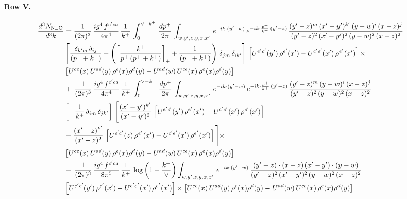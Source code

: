 \documentclass[10pt]{article}
\numberwithin{equation}{section}
\begin{document}
\paragraph{Row V.}
\begin{align}
    \frac{d^{3}N_{\rm NLO}}{d^{3}k} & =  \frac{1}{(2\pi)^{3}}\, \frac{ig^{4}\,f^{c'ca}}{4\pi^{4}}\, \frac{1}{k^{+}}\,\int_{0}^{\vee-k^{+}}\, \frac{dp^{+}}{2\pi}\, \int_{w,y',z,y,x,x'}\, e^{-ik\cdot (y'-w)}\, e^{-ik\cdot \frac{p^{+}}{k^{+}}\,(y'-z)}\,\frac{(y'-z)^{m}\,(x'-y')^{k'}\,(y-w)^{i}\,(x-z)^{j}}{(y'-z)^{2}\,(x'-y')^{2}\,(y-w)^{2}\,(x-z)^{2}}\notag \\ & \left[\frac{\delta_{k'm}\,\delta_{ij}}{(p^{+}+k^{+})}-\left(\left[\frac{k^{+}}{p^{+}\,(p^{+}+k^{+})}\right]_{+}+\frac{1}{(p^{+}+k^{+})}\right)\,\delta_{jm}\,\delta_{ik'}\right]\, \left[U^{e'c'}(y')\,\rho^{e'}(x')-U^{c'e'}(x')\,\rho^{e'}(x')\right]\times \notag \\ &  \left[U^{ce}(x)\,U^{ad}(y)\,\rho^{e}(x)\rho^{d}(y)-U^{ad}(w)\,U^{ce}(x)\,\rho^{e}(x)\rho^{d}(y)\right] \notag \\
&   +\,\frac{1}{(2\pi)^{3}}\, \frac{ig^{4}\,f^{c'ca}}{4\pi^{4}}\, \frac{1}{k^{+}}\,\int_{0}^{\vee-k^{+}}\, \frac{dp^{+}}{2\pi}\, \int_{w,y',z,y,x,x'}\, e^{-ik\cdot (y'-w)}\, e^{-ik\cdot \frac{p^{+}}{k^{+}}\,(y'-z)}\,\frac{(y'-z)^{m}\,(y-w)^{i}\,(x-z)^{j}}{(y'-z)^{2}\,(y-w)^{2}\,(x-z)^{2}}\notag \\ &   \left[-\frac{1}{k^{+}}\, \delta_{im}\, \delta_{jk'}\right]\, \Bigg[\frac{(x'-y')^{k'}}{(x'-y')^{2}}\,\left[U^{e'c'}(y')\,\rho^{e'}(x')-U^{c'e'}(x')\,\rho^{e'}(x')\right]\notag \\ & -\frac{(x'-z)^{k'}}{(x'-z)^{2}}\,\left[U^{e'c'}(z)\,\rho^{e'}(x')-U^{c'e'}(x')\,\rho^{e'}(x')\right]\Bigg]\times \notag \\ &    \left[U^{ce}(x)\,U^{ad}(y)\,\rho^{e}(x)\rho^{d}(y)-U^{ad}(w)\,U^{ce}(x)\,\rho^{e}(x)\rho^{d}(y)\right] \notag \\
& -\,\frac{1}{(2\pi)^{3}}\, \frac{ig^{4}\,f^{c'ca}}{8\pi^{5}}\, \frac{1}{k^{+}}\,\log{\left(1-\frac{k^{+}}{\vee}\right)} \int_{w,y',z,y,x,x'}\, e^{-ik\cdot (y'-w)}\,\frac{(y'-z)\cdot (x-z)\,(x'-y')\cdot (y-w)}{(y'-z)^{2}\,(x'-y')^{2}\,(y-w)^{2}\,(x-z)^{2}}\notag \\ & \left[U^{e'c'}(y')\,\rho^{e'}(x')-U^{c'e'}(x')\,\rho^{e'}(x')\right]\times  \left[U^{ce}(x)\,U^{ad}(y)\,\rho^{e}(x)\rho^{d}(y)-U^{ad}(w)\,U^{ce}(x)\,\rho^{e}(x)\rho^{d}(y)\right]
\end{align}
\end{document}

